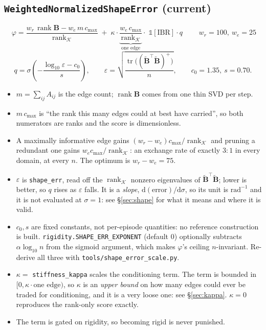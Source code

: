 \documentclass[11pt,a4paper]{article}
\newcommand{\rk}{\operatorname{rank}}
\newcommand{\B}{\mathbf{B}}
\newcommand{\Bs}{\widetilde{\mathbf{B}}}
\begin{document}
\subsection*{\texttt{WeightedNormalizedShapeError} (current)}
\[
\boxed{\;
\varphi=\frac{w_r\,\rk\B-w_e\,m\,c_{\max}}{\rk_{\mathcal K}}
\;+\;\kappa\cdot\underbrace{\frac{w_e\,c_{\max}}{\rk_{\mathcal K}}}_{\text{one edge}}\cdot\;
\mathbb 1[\text{IBR}]\cdot q\;}
\qquad w_r=100,\ w_e=25
\]
\[
q=\sigma\!\left(-\frac{\log_{10}\varepsilon-c_0}{s}\right),
\qquad
\varepsilon=\sqrt{\frac{\operatorname{tr}\big((\Bs^{\!\top}\Bs)^{+}\big)}{n}},
\qquad c_0=1.35,\ s=0.70 .
\]

\begin{itemize}\itemsep2pt
\item $m=\sum_{ij}A_{ij}$ is the edge count; $\rk\B$ comes from one thin SVD per step.
\item $m\,c_{\max}$ is ``the rank this many edges could at best have carried'', so both
      numerators are ranks and the score is dimensionless.
\item A maximally informative edge gains $(w_r-w_e)c_{\max}/\rk_{\mathcal K}$ and pruning a
      redundant one gains $w_e c_{\max}/\rk_{\mathcal K}$: an exchange rate of exactly $3{:}1$
      in every domain, at every $n$. The optimum is $w_r-w_e=75$.
\item $\varepsilon$ is \texttt{shape\_err}, read off the $\rk_{\mathcal K}$ nonzero
      eigenvalues of $\Bs^{\!\top}\Bs$; lower is better, so $q$ rises as $\varepsilon$ falls.
      It is a \emph{slope}, $\mathrm d(\text{error})/\mathrm d\sigma$, so its unit is
      $\mathrm{rad}^{-1}$ and it is not evaluated at $\sigma=1$: see \S\ref{sec:shape}
      for what it means and where it is valid.
\item $c_0,s$ are fixed constants, not per-episode quantities: no reference construction is
      built. \texttt{rigidity.SHAPE\_ERR\_EXPONENT} (default $0$) optionally subtracts
      $\alpha\log_{10}n$ from the sigmoid argument, which makes $\varphi$'s ceiling
      $n$-invariant. Re-derive all three with \texttt{tools/shape\_error\_scale.py}.
\item $\kappa=$ \texttt{stiffness\_kappa} scales the conditioning term. The term is
      bounded in $[0,\kappa\cdot\text{one edge})$, so $\kappa$ is an \emph{upper bound} on
      how many edges could ever be traded for conditioning, and it is a very loose one:
      see \S\ref{sec:kappa}. $\kappa=0$ reproduces the rank-only score exactly.
\item The term is gated on rigidity, so becoming rigid is never punished.
\end{itemize}
\end{document}
